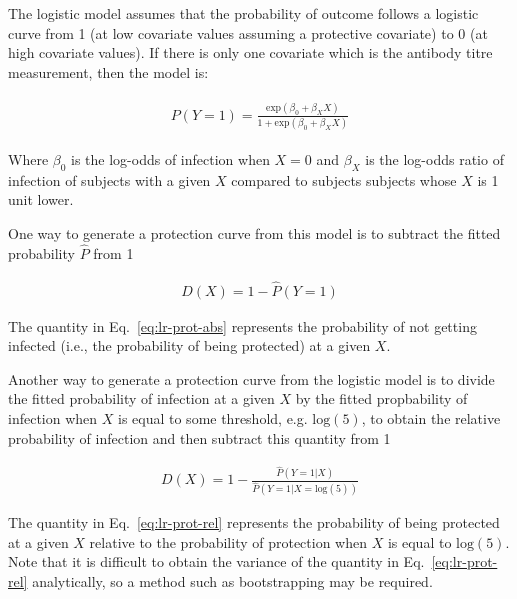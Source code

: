 The logistic model assumes that the probability of outcome follows a logistic curve from 1 (at low covariate values assuming a protective covariate) to 0 (at high covariate values). If there is only one covariate which is the antibody titre measurement, then the model is:

\begin{align*}
    \begin{gathered}
        P(Y=1) = \frac{\text{exp}(\beta_0 + \beta_X X)}{1 + \text{exp}(\beta_0 + \beta_X X)}
    \end{gathered}
\end{align*}

Where $\beta_0$ is the log-odds of infection when $X=0$ and $\beta_X$ is the log-odds ratio of infection of subjects with a given $X$ compared to subjects subjects whose $X$ is 1 unit lower.

One way to generate a protection curve from this model is to subtract the fitted probability $\hat{P}$ from 1

\begin{gather}
    D(X) = 1 - \hat{P}(Y=1)
    \label{eq:lr-prot-abs}
\end{gather}

The quantity in Eq.~\ref{eq:lr-prot-abs} represents the probability of not getting infected (i.e., the probability of being protected) at a given $X$.

Another way to generate a protection curve from the logistic model is to divide the fitted probability of infection at a given $X$ by the fitted propbability of infection when $X$ is equal to some threshold, e.g. $\text{log}(5)$, to obtain the relative probability of infection and then subtract this quantity from 1

\begin{gather}
    D(X) = 1 - \frac{\hat{P}(Y=1 | X)}{\hat{P}(Y=1 | X = \text{log}(5))}
    \label{eq:lr-prot-rel}
\end{gather}

The quantity in Eq.~\ref{eq:lr-prot-rel} represents the probability of being protected at a given $X$ relative to the probability of protection when $X$ is equal to $\text{log}(5)$. Note that it is difficult to obtain the variance of the quantity in Eq.~\ref{eq:lr-prot-rel} analytically, so a method such as bootstrapping may be required.
